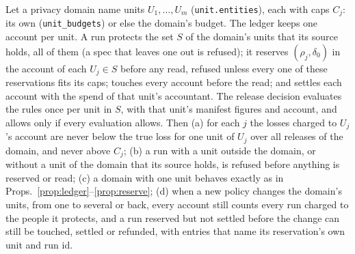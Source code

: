 \setcounter{proposition}{1703}
\begin{proposition}\label{prop:multigov}
Let a privacy domain name units $U_1,\dots,U_m$ (\texttt{unit.entities}), each with caps $C_j$: its own (\texttt{unit\_budgets}) or else the domain's budget. The ledger keeps one account per unit. A run protects the set $S$ of the domain's units that its source holds, all of them (a spec that leaves one out is refused); it reserves $(\rho_j,\delta_0)$ in the account of each $U_j\in S$ before any read, refused unless every one of these reservations fits its caps; touches every account before the read; and settles each account with the spend of that unit's accountant. The release decision evaluates the rules once per unit in $S$, with that unit's manifest figures and account, and allows only if every evaluation allows. Then (a) for each $j$ the losses charged to $U_j$'s account are never below the true loss for one unit of $U_j$ over all releases of the domain, and never above $C_j$; (b) a run with a unit outside the domain, or without a unit of the domain that its source holds, is refused before anything is reserved or read; (c) a domain with one unit behaves exactly as in Props.~\ref{prop:ledger}--\ref{prop:reserve}; (d) when a new policy changes the domain's units, from one to several or back, every account still counts every run charged to the people it protects, and a run reserved but not settled before the change can still be touched, settled or refunded, with entries that name its reservation's own unit and run id.
\end{proposition}
